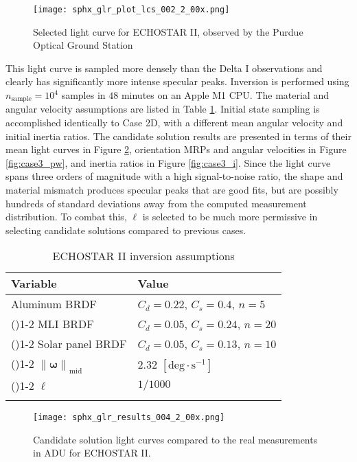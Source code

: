 \documentclass[a4paper,twocolumn]{spaceDebrisC} %
\newcommand{\grule}[0]{\arrayrulecolor{darkgray}\cmidrule(){1-2}}
\newcommand{\brule}[0]{\arrayrulecolor{black} \bottomrule}
\newcommand{\vctr}[1]{\bm{#1}}
\newcommand{\norm}[1]{\left\lVert#1\right\rVert}
\newcommand{\figmed}[0]{0.35\textwidth}
\begin{document}
\begin{figure}[H]
  \centering
  \texttt{[image: sphx\_glr\_plot\_lcs\_002\_2\_00x.png]}
  \caption{Selected light curve for ECHOSTAR II, observed by the Purdue Optical Ground Station}
  \label{fig:sat_lc_obs}
\end{figure}

This light curve is sampled more densely than the Delta I observations and clearly has significantly more intense specular peaks. Inversion is performed using $n_\text{sample}=10^4$ samples in $48$ minutes on an Apple M1 CPU. The material and angular velocity assumptions are listed in Table \ref{tb:case3_ass}. Initial state sampling is accomplished identically to Case 2D, with a different mean angular velocity and initial inertia ratios. The candidate solution results are presented in terms of their mean light curves in Figure \ref{fig:case3_s}, orientation MRPs and angular velocities in Figure \ref{fig:case3_pw}, and inertia ratios in Figure \ref{fig:case3_i}. Since the light curve spans three orders of magnitude with a high signal-to-noise ratio, the shape and material mismatch produces specular peaks that are good fits, but are possibly hundreds of standard deviations away from the computed measurement distribution. To combat this, $\ell$ is selected to be much more permissive in selecting candidate solutions compared to previous cases.

\begin{table}[H]
  \centering
  \renewcommand{\arraystretch}{1.2} 
  \caption{ECHOSTAR II inversion assumptions}
  \vspace*{6pt}
  \begin{tabular}{@{} l l @{}}
    \toprule
 Variable & Value \\ \midrule
 Aluminum BRDF & $C_d=0.22$, $C_s=0.4$, $n=5$ \\ \grule
 MLI BRDF & $C_d=0.05$, $C_s=0.24$, $n=20$ \\ \grule
 Solar panel BRDF & $C_d=0.05$, $C_s=0.13$, $n=10$ \\ \grule
    $\norm{\vctr{\omega}}_\text{mid}$ & $2.32$ $[\text{deg} \cdot \text{s}^{-1}]$ \\ \grule
    $\ell$ & $1/1000$ \\ \brule
  \end{tabular}
  \label{tb:case3_ass}
\end{table}

\begin{figure}[H]
  \centering
  \texttt{[image: sphx\_glr\_results\_004\_2\_00x.png]}
  \caption{Candidate solution light curves compared to the real measurements in ADU for ECHOSTAR II.}
  \label{fig:case3_s}
\end{figure}
\end{document}
